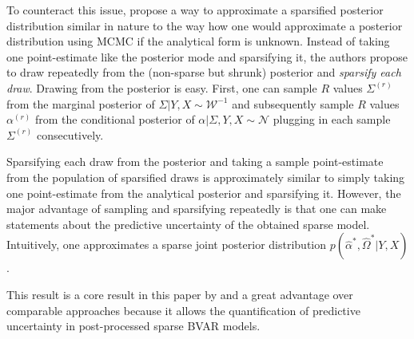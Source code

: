 To counteract this issue, \textcite{hauzenberger_combining_2021} propose a way to approximate a sparsified posterior distribution similar in nature to the way how one would approximate a posterior distribution using MCMC if the analytical form is unknown. Instead of taking one point-estimate like the posterior mode and sparsifying it, the authors propose to draw repeatedly from the (non-sparse but shrunk) posterior and \emph{sparsify each draw}. Drawing from the posterior is easy. First, one can sample $R$ values $\Sigma^{(r)}$ from the marginal posterior of $\Sigma | Y , X \sim \mathcal{W}^{-1}$ and subsequently sample $R$ values $\alpha^{(r)}$ from the conditional posterior of $\alpha | \Sigma , Y , X \sim \mathcal{N}$ plugging in each sample $\Sigma^{(r)}$ consecutively.

Sparsifying each draw from the posterior and taking a sample point-estimate from the population of sparsified draws is approximately similar to simply taking one point-estimate from the analytical posterior and sparsifying it. However, the major advantage of sampling and sparsifying repeatedly is that one can make statements about the predictive uncertainty of the obtained sparse model. Intuitively, one approximates a sparse joint posterior distribution $p(\hat{\alpha}^* , \hat{\Omega}^* | Y , X)$.

This result is a core result in this paper by \textcite{hauzenberger_combining_2021} and a great advantage over comparable approaches \parencite{hahn_decoupling_2015} because it allows the quantification of predictive uncertainty in post-processed sparse BVAR models. 
